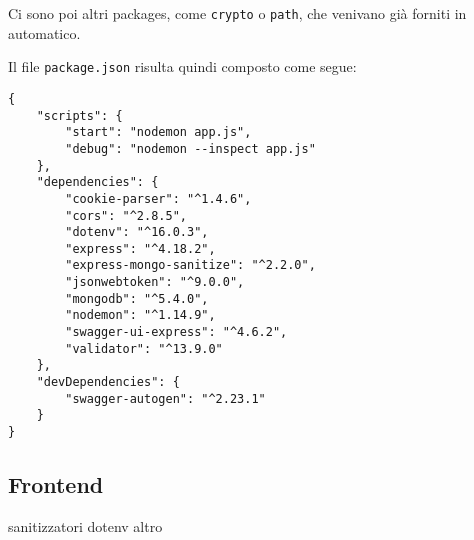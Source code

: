 Ci sono poi altri packages, come \verb|crypto| o \verb|path|, che venivano già forniti in automatico.

Il file \verb|package.json| risulta quindi composto come segue:
\begin{lstlisting}
{
    "scripts": {
        "start": "nodemon app.js",
        "debug": "nodemon --inspect app.js"
    },
    "dependencies": {
        "cookie-parser": "^1.4.6",
        "cors": "^2.8.5",
        "dotenv": "^16.0.3",
        "express": "^4.18.2",
        "express-mongo-sanitize": "^2.2.0",
        "jsonwebtoken": "^9.0.0",
        "mongodb": "^5.4.0",
        "nodemon": "^1.14.9",
        "swagger-ui-express": "^4.6.2",
        "validator": "^13.9.0"
    },
    "devDependencies": {
        "swagger-autogen": "^2.23.1"
    }
}
\end{lstlisting}
\subsection{Frontend}

sanitizzatori
dotenv
altro
\newpage